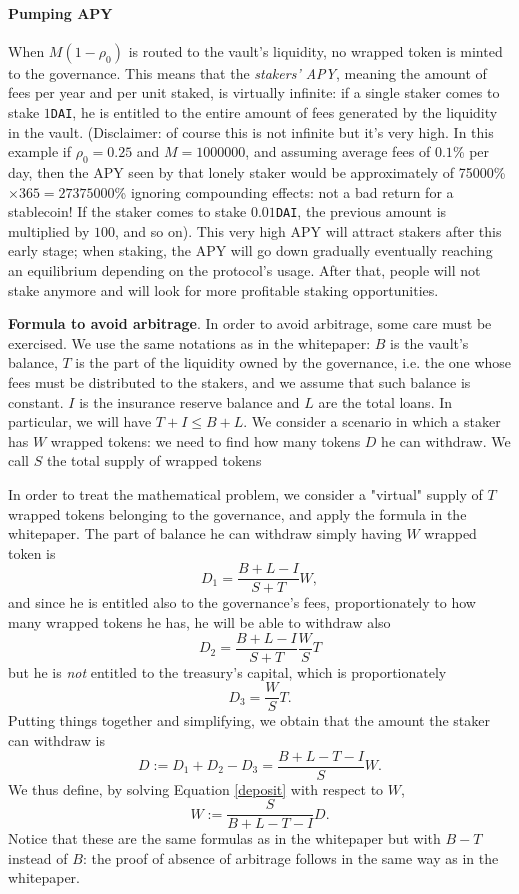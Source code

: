 \documentclass[a4paper,10 pt]{article}
\theoremstyle{definition}
\begin{document}
\paragraph{Pumping APY}
When $M(1-\rho_0)$ is routed to the vault's liquidity, no wrapped token is minted to the governance. This means that the {\it stakers' APY}, meaning the amount of fees per year and per unit staked, is virtually infinite: if a single staker comes to stake $1$\verb|DAI|, he is entitled to the entire amount of fees generated by the liquidity in the vault. (Disclaimer: of course this is not infinite but it's very high. In this example if $\rho_0 = 0.25$ and $M = 1000000$, and assuming average fees of $0.1$\% per day, then the APY seen by that lonely staker would be approximately of 75000\% $\times 365 = 27375000$\% ignoring compounding effects: not a bad return for a stablecoin! If the staker comes to stake $0.01$\verb|DAI|, the previous amount is multiplied by $100$, and so on).
This very high APY will attract stakers after this early stage; when staking, the APY will go down gradually eventually reaching an equilibrium depending on the protocol's usage. After that, people will not stake anymore and will look for more profitable staking opportunities.

{\bf Formula to avoid arbitrage}. In order to avoid arbitrage, some care must be exercised. We use the same notations as in the whitepaper: $B$ is the vault's balance, $T$ is the part of the liquidity owned by the governance, i.e. the one whose fees must be distributed to the stakers, and we assume that such balance is constant. $I$ is the insurance reserve balance and $L$ are the total loans. In particular, we will have $T + I \le B + L$. We consider a scenario in which a staker has $W$ wrapped tokens: we need to find how many tokens $D$ he can withdraw. We call $S$ the total supply of wrapped tokens

In order to treat the mathematical problem, we consider a "virtual" supply of $T$ wrapped tokens belonging to the governance, and apply the formula in the whitepaper. The part of balance he can withdraw simply having $W$ wrapped token is $$D_1 = \frac{B + L - I}{S + T}W,$$ and since he is entitled also to the governance's fees, proportionately to how many wrapped tokens he has, he will be able to withdraw also $$D_2 =  \frac{B + L - I}{S + T}\frac{W}{S}T $$ but he is {\it not} entitled to the treasury's capital, which is proportionately $$D_3 = \frac{W}{S}T.$$ Putting things together and simplifying, we obtain that the amount the staker can withdraw is
\begin{equation}\label{deposit}D := D_1 + D_2 - D_3 = \frac{B+L-T-I}{S}W.\end{equation}
We thus define, by solving Equation \eqref{deposit} with respect to $W$,
\begin{equation}\label{wrappedTokens}W := \frac{S}{B+L-T-I}D.\end{equation}
Notice that these are the same formulas as in the whitepaper but with $B-T$ instead of $B$: the proof of absence of arbitrage follows in the same way as in the whitepaper.
\end{document}
